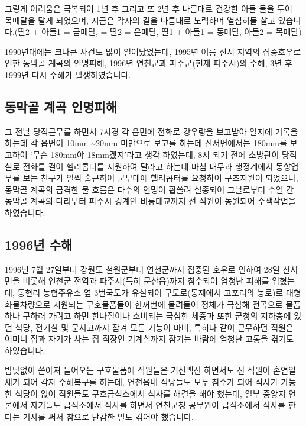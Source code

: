 \documentclass[chapter,book,openany,twoside]{oblivoir}
\begin{document}
그렇게 어려움은 극복되어 1년 후 그리고 또 2년 후 나름대로 건강한 아들 둘을 두어 목메달을 달게 되었으며, 지금은 각자의 길을 나름대로 노력하며 열심히들 살고 있습니다.(딸2 + 아들1 = 금메달, =  딸2 = 은메달, 딸1 + 아들1 = 동메달, 아들2 = 목메달)

1990년대에는 크나큰 사건도 많이 일어났었는데, 1995년 여름 신서 지역의 집중호우로 인한 동막골 계곡의 인명피해, 1996년 연천군과 파주군(현재 파주시)의 수해, 3년 후 1999년 다시 수해가 발생하였습니다.

\subsection{동막골 계곡 인명피해}

그 전날 당직근무를 하면서 7시경 각 읍면에 전화로 강우량을 보고받아 일지에 기록을 하는데 각 읍면이 10mm \textasciitilde 20mm 미만으로 보고를 하는데 신서면에서는 180mm를 보고하여 `무슨 180mm야 18mm겠지'라고 생각 하였는데, 8시 되기 전에 소방관이 당직실로 전화를 걸어 헬리콥터를 지원하여 달라고 하는데 마침 내무과 행정계에서 동향업무를 보는 친구가 일찍 출근하여 군부대에 헬리콥터를 요청하여 구조지원이 되었으나, 동막골 계곡의 급격한 물 흐름은 다수의 인명이 휩쓸려 실종되어 그날로부터 수일 간 동막골 계곡의 다리부터 파주시 경계인 비룡대교까지 전 직원이 동원되어 수색작업을 하였습니다. 

\subsection{1996년 수해}

1996년 7월 27일부터 강원도 철원군부터 연천군까지 집중된 호우로  인하여 28일 신서면을 비롯해 연천군 전역과 파주시(특히 문산읍)까지 침수되어 엄청난 피해를 입혔는데, 통현리 농협주유소 옆 3번국도가 유실되어 구도로(통제에서 고포리의 농로)로 대형화물차량으로 지원되는 구호물품들이 한꺼번에 몰려들어 정체가 극심해 전곡으로 물품 하나 구하러 가려고 하면 한나절이나 소비되는 극심한 체증과 또한 군청의 지하층에 있던 식당, 전기실 및 문서고까지 잠겨 모든 기능이 마비, 특히나 같이 근무하던 직원은 어머니 집과 자기가 사는 집 직장인 기계실까지 잠기는 바람에 엄청난 고통을 겪기도 하였습니다.

밤낮없이 쏟아져 들어오는 구호물품에 직원들은 기진맥진 하면서도 전 직원이 혼연일체가 되어 각자 수해복구를 하는데, 연천읍내 식당들도 모두 침수가 되어 식사가 가능한 식당이 없어 직원들도 구호급식소에서 식사를 해결을 해야 했는데, 일부 중앙지 언론에서 자기들도 급식소에서 식사를 하면서 연천군청 공무원이 급식소에서 식사를 한다는 기사를 써서 참으로 난감한 일도 겪어야 했습니다.
\end{document}
